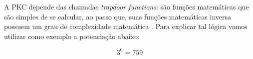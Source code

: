 A PKC depende das chamadas \textit{trapdoor functions}: são funções matemáticas que são simples de se calcular, ao passo que,  suas funções matemáticas inversa possuem um grau de complexidade matemática . Para explicar tal lógica vamos utilizar como exemplo a potenciação abaixo:

\begin{equation}
   3^6 = 759 
  \label{eq:cifra_publica_funcao}
\end{equation}










